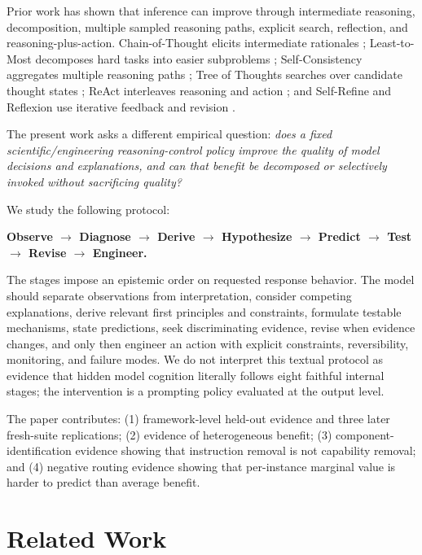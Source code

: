 \documentclass[11pt]{article}
\begin{document}
Prior work has shown that inference can improve through intermediate reasoning, decomposition, multiple sampled reasoning paths, explicit search, reflection, and reasoning-plus-action. Chain-of-Thought elicits intermediate rationales \citep{wei2022chain}; Least-to-Most decomposes hard tasks into easier subproblems \citep{zhou2023least}; Self-Consistency aggregates multiple reasoning paths \citep{wang2023selfconsistency}; Tree of Thoughts searches over candidate thought states \citep{yao2023tree}; ReAct interleaves reasoning and action \citep{yao2023react}; and Self-Refine and Reflexion use iterative feedback and revision \citep{madaan2023selfrefine,shinn2023reflexion}.

The present work asks a different empirical question: \emph{does a fixed scientific/engineering reasoning-control policy improve the quality of model decisions and explanations, and can that benefit be decomposed or selectively invoked without sacrificing quality?}

We study the following protocol:
\begin{center}
\textbf{Observe $\rightarrow$ Diagnose $\rightarrow$ Derive $\rightarrow$ Hypothesize $\rightarrow$ Predict $\rightarrow$ Test $\rightarrow$ Revise $\rightarrow$ Engineer.}
\end{center}

The stages impose an epistemic order on requested response behavior. The model should separate observations from interpretation, consider competing explanations, derive relevant first principles and constraints, formulate testable mechanisms, state predictions, seek discriminating evidence, revise when evidence changes, and only then engineer an action with explicit constraints, reversibility, monitoring, and failure modes. We do not interpret this textual protocol as evidence that hidden model cognition literally follows eight faithful internal stages; the intervention is a prompting policy evaluated at the output level.

The paper contributes: (1) framework-level held-out evidence and three later fresh-suite replications; (2) evidence of heterogeneous benefit; (3) component-identification evidence showing that instruction removal is not capability removal; and (4) negative routing evidence showing that per-instance marginal value is harder to predict than average benefit.

\section{Related Work}
\end{document}
